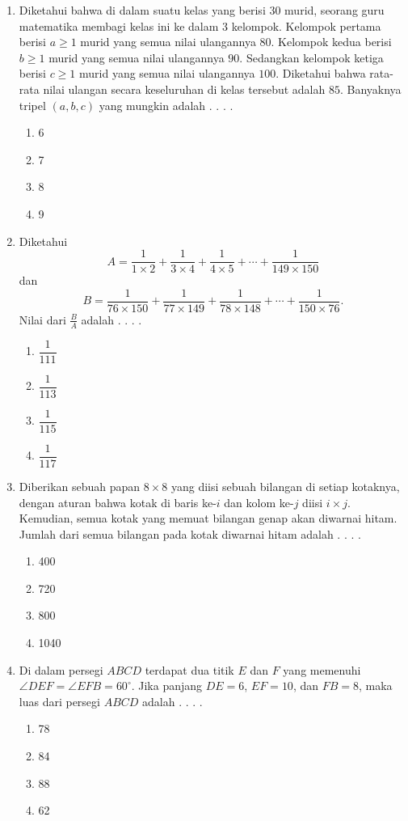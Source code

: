 \documentclass[11pt, a4paper]{scrartcl}
\begin{document}
\begin{enumerate}
    \item Diketahui bahwa di dalam suatu kelas yang berisi $30$ murid, seorang guru matematika membagi kelas ini ke dalam 3 kelompok. Kelompok pertama berisi $a\ge 1$ murid yang semua nilai ulangannya $80$. Kelompok kedua berisi $b\ge 1$ murid yang semua nilai ulangannya $90$. Sedangkan kelompok ketiga berisi $c\ge 1$ murid yang semua nilai ulangannya $100$. Diketahui bahwa rata-rata nilai ulangan secara keseluruhan di kelas tersebut adalah $85$. Banyaknya tripel $(a,b,c)$ yang mungkin adalah . . . .
    \begin{enumerate}[label={(\Alph*)}]
        \item 6 \item 7 \item 8 \item 9
    \end{enumerate}

    \item Diketahui
    $$ A =\frac{1}{1\times 2} + \frac{1}{3\times 4}+\frac{1}{4\times 5}+\cdots + \frac{1}{149\times 150} $$
    dan 
    $$ B =\frac{1}{76\times 150} + \frac{1}{77\times 149} + \frac{1}{78\times 148}+\cdots + \frac{1}{150\times 76}. $$
    Nilai dari $\frac{B}{A}$ adalah . . . .
    \begin{enumerate}[label={(\Alph*)}]
        \item $\dfrac{1}{111}$ \item $\dfrac{1}{113}$ \item $\dfrac{1}{115}$ \item $\dfrac{1}{117}$
    \end{enumerate}

    \item Diberikan sebuah papan $8\times 8$ yang diisi sebuah bilangan di setiap kotaknya, dengan aturan bahwa kotak di baris ke-$i$ dan kolom ke-$j$ diisi $i\times j$. Kemudian, semua kotak yang memuat bilangan genap akan diwarnai hitam. Jumlah dari semua bilangan pada kotak diwarnai hitam adalah . . . .
    \begin{enumerate}[label={(\Alph*)}]
        \item 400 \item 720 \item 800 \item 1040
    \end{enumerate}

    \item Di dalam persegi $ABCD$ terdapat dua titik $E$ dan $F$ yang memenuhi $\angle DEF=\angle EFB=60^\circ$. Jika panjang $DE=6$, $EF=10$, dan $FB=8$, maka luas dari persegi $ABCD$ adalah . . . .
    \begin{enumerate}[label={(\Alph*)}]
        \item 78 \item 84 \item 88 \item 62
    \end{enumerate}


\end{enumerate}
\end{document}
